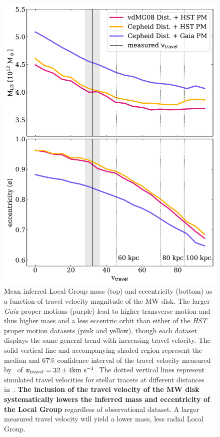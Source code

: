 \documentclass[twocolumn]{aastex631}
\newcommand{\bov}{\ensuremath{\boldsymbol{v}}}
\newcommand{\vtrav}{\ensuremath{\bov_{\rm travel}}}
\begin{document}
\begin{figure}[htb]
    \centering
    \includegraphics[width=\columnwidth]{analyze-runs-massAndEcc.pdf}
    \caption{\label{fig:mvsv}
    Mean inferred Local Group mass (top) and eccentricity (bottom) as a function
    of travel velocity magnitude of the MW disk.
    The larger \textit{Gaia} proper motions (purple) lead to higher transverse
    motion and thus higher mass and a less eccentric orbit than either of the
    \textit{HST} proper motion datasets (pink and yellow), though each dataset
    displays the same general trend with increasing travel velocity.
    The solid vertical line and accompanying shaded region represent the median
    and 67\% confidence interval of the travel velocity measured
    by~\cite{Petersen2021} of $\vtrav=32\pm 4\kms$.
    The dotted vertical lines represent simulated travel velocities for
    stellar tracers at different distances in~\cite{Garavito-Camargo2021b}.
    \textbf{The inclusion of the travel velocity of the MW disk systematically
    lowers the inferred mass and eccentricity of the Local Group} regardless of
    observational dataset. A larger measured travel velocity will yield a lower
    mass, less radial Local Group.}
  \end{figure}
\end{document}
